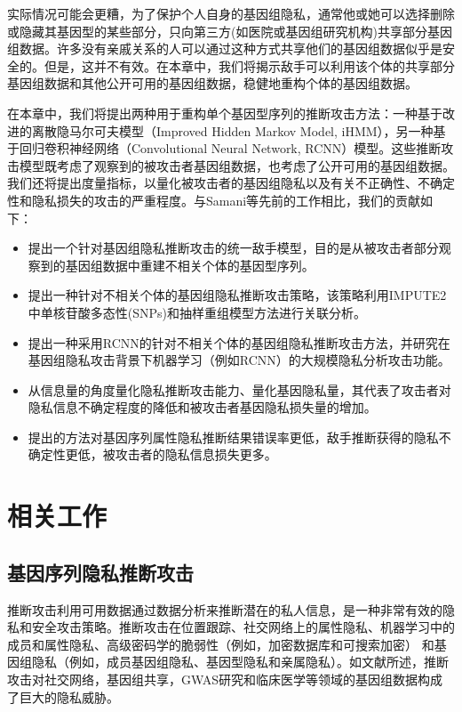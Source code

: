 实际情况可能会更糟，为了保护个人自身的基因组隐私，通常他或她可以选择删除或隐藏其基因型的某些部分\cite{shi2017overview}，只向第三方(如医院或基因组研究机构)共享部分基因组数据。许多没有亲戚关系的人可以通过这种方式共享他们的基因组数据似乎是安全的。但是，这并不有效。在本章中，我们将揭示敌手可以利用该个体的共享部分基因组数据和其他公开可用的基因组数据，稳健地重构个体的基因组数据。

在本章中，我们将提出两种用于重构单个基因型序列的推断攻击方法：一种基于改进的离散隐马尔可夫模型（Improved Hidden Markov Model, iHMM），另一种基于回归卷积神经网络（Convolutional Neural Network, RCNN）模型。这些推断攻击模型既考虑了观察到的被攻击者基因组数据，也考虑了公开可用的基因组数据。我们还将提出度量指标，以量化被攻击者的基因组隐私以及有关不正确性、不确定性和隐私损失的攻击的严重程度。与Samani等\cite{samani2015quantifying}先前的工作相比，我们的贡献如下：
\begin{itemize}
	\item 提出一个针对基因组隐私推断攻击的统一敌手模型，目的是从被攻击者部分观察到的基因组数据中重建不相关个体的基因型序列。
	\item 提出一种针对不相关个体的基因组隐私推断攻击策略，该策略利用IMPUTE2\cite{howie2009flexible}中单核苷酸多态性(SNPs)和抽样重组模型方法进行关联分析。
	\item 提出一种采用RCNN的针对不相关个体的基因组隐私推断攻击方法，并研究在基因组隐私攻击背景下机器学习（例如RCNN）的大规模隐私分析攻击功能。
	\item 从信息量的角度量化隐私推断攻击能力、量化基因隐私量，其代表了攻击者对隐私信息不确定程度的降低和被攻击者基因隐私损失量的增加。
	\item 提出的方法对基因序列属性隐私推断结果错误率更低，敌手推断获得的隐私不确定性更低，被攻击者的隐私信息损失更多。
\end{itemize}

\section{相关工作}\label{sec:relat}
\subsection{基因序列隐私推断攻击}

推断攻击利用可用数据通过数据分析来推断潜在的私人信息\cite{en2018inference}，是一种非常有效的隐私和安全攻击策略。推断攻击在位置跟踪\cite{narain2016inferring}、社交网络上的属性隐私\cite{gong2016you}、机器学习中的成员和属性隐私\cite{shokri2017membership,ganju2018property}、高级密码学的脆弱性（例如，加密数据库和可搜索加密）\cite{pouliot2016shadow} 和基因组隐私（例如，成员基因组隐私\cite{wang2009learning}、基因型隐私\cite{samani2015quantifying,he2017addressing}和亲属隐私\cite{humbert2013addressing}）。如文献\cite{ayday2017inference}所述，推断攻击对社交网络，基因组共享，GWAS研究和临床医学等领域的基因组数据构成了巨大的隐私威胁。

